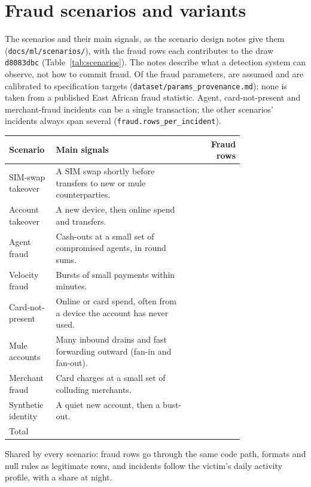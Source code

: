 \section{Fraud scenarios and variants}
\label{app:scenarios}

The \nScenarios{} scenarios and their main signals, as the scenario design notes give them
(\texttt{docs/\allowbreak ml/\allowbreak scenarios/}), with the fraud rows each contributes to the draw \texttt{d8083dbc}
(Table~\ref{tab:scenarios}). The notes describe what a detection system can observe, not how to
commit fraud. Of the \nProvFraudTotal{} fraud parameters, \nProvFraudAssumed{} are assumed and
\nProvFraudCalibrated{} are calibrated to specification targets
(\texttt{dataset/\allowbreak params\_provenance.md}); none is taken from a published East African
fraud statistic. Agent, card-not-present and merchant-fraud incidents can be a single transaction;
the other scenarios' incidents always span several (\texttt{fraud.rows\_per\_incident}).

\begin{longtable}{p{0.2\linewidth}p{0.58\linewidth}r}
\toprule
Scenario & Main signals & Fraud rows \\
\midrule
\endhead
SIM-swap takeover & A SIM swap shortly before transfers to new or mule counterparties. & \nScenSimSwap{} \\
Account takeover & A new device, then online spend and transfers. & \nScenATO{} \\
Agent fraud & Cash-outs at a small set of compromised agents, in round sums. & \nScenAgent{} \\
Velocity fraud & Bursts of small payments within minutes. & \nScenVelocity{} \\
Card-not-present & Online or card spend, often from a device the account has never used. & \nScenCNP{} \\
Mule accounts & Many inbound drains and fast forwarding outward (fan-in and fan-out). & \nScenMule{} \\
Merchant fraud & Card charges at a small set of colluding merchants. & \nScenMerchant{} \\
Synthetic identity & A quiet new account, then a bust-out. & \nScenSynth{} \\
\midrule
Total & & \nScenTotal{} \\
\bottomrule
\end{longtable}

Shared by every scenario: fraud rows go through the same code path, formats and null rules as
legitimate rows, and incidents follow the victim's daily activity profile, with a share at night.


